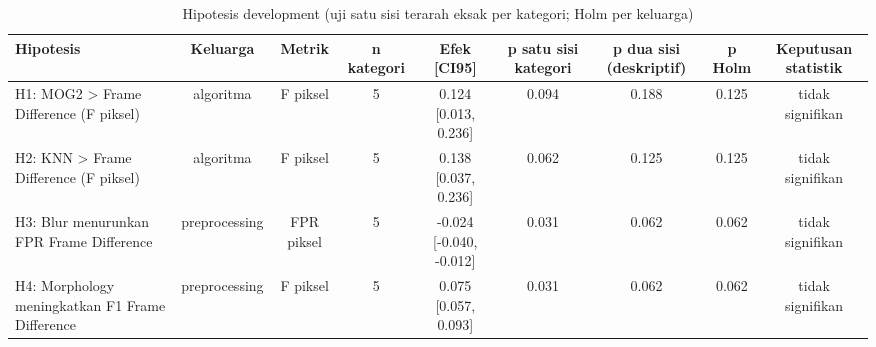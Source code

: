 \begin{table}[t]
\centering
\caption{Hipotesis development (uji satu sisi terarah eksak per kategori; Holm per keluarga)}
\label{tab:table_hypotheses}
\begin{tabular}{lcccccccc}
\toprule
Hipotesis & Keluarga & Metrik & n kategori & Efek [CI95] & p satu sisi kategori & p dua sisi (deskriptif) & p Holm & Keputusan statistik \\
\midrule
H1: MOG2 > Frame Difference (F piksel) & algoritma & F piksel & 5 & 0.124 [0.013, 0.236] & 0.094 & 0.188 & 0.125 & tidak signifikan \\
H2: KNN > Frame Difference (F piksel) & algoritma & F piksel & 5 & 0.138 [0.037, 0.236] & 0.062 & 0.125 & 0.125 & tidak signifikan \\
H3: Blur menurunkan FPR Frame Difference & preprocessing & FPR piksel & 5 & -0.024 [-0.040, -0.012] & 0.031 & 0.062 & 0.062 & tidak signifikan \\
H4: Morphology meningkatkan F1 Frame Difference & preprocessing & F piksel & 5 & 0.075 [0.057, 0.093] & 0.031 & 0.062 & 0.062 & tidak signifikan \\
\bottomrule
\end{tabular}
\end{table}
